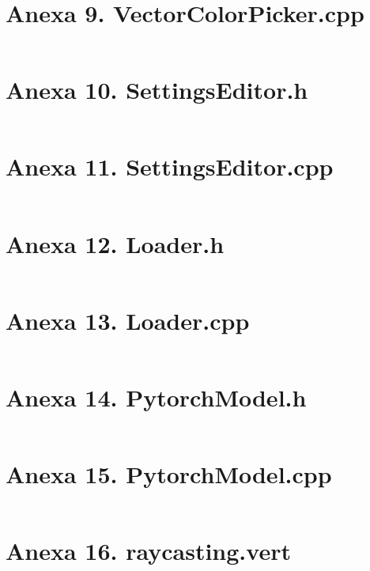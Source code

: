 \section{Anexa 9. VectorColorPicker.cpp}
\label{appendix:9_tfwidget_cpp}
\inputminted[linenos,tabsize=4,breaklines]{C++}{code/cpp/VectorColorPicker.cpp}

\section{Anexa 10. SettingsEditor.h}
\label{appendix:10_settingsedit_h}
\inputminted[linenos,tabsize=4,breaklines]{C++}{code/cpp/SettingsEditor.h}

\section{Anexa 11. SettingsEditor.cpp}
\label{appendix:11_settingsedit_cpp}
\inputminted[linenos,tabsize=4,breaklines]{C++}{code/cpp/SettingsEditor.cpp}

\section{Anexa 12. Loader.h}
\label{appendix:12_loader_h}
\inputminted[linenos,tabsize=4,breaklines]{C++}{code/cpp/Loader.h}

\section{Anexa 13. Loader.cpp}
\label{appendix:13_loader_cpp}
\inputminted[linenos,tabsize=4,breaklines]{C++}{code/cpp/Loader.cpp}

\section{Anexa 14. PytorchModel.h}
\label{appendix:14_ptmodel_h}
\inputminted[linenos,tabsize=4,breaklines]{C++}{code/cpp/PytorchModel.h}

\section{Anexa 15. PytorchModel.cpp}
\label{appendix:15_ptmodel_cpp}
\inputminted[linenos,tabsize=4,breaklines]{C++}{code/cpp/PytorchModel.cpp}

\section{Anexa 16. raycasting.vert}
\label{appendix:16_raycasting_vert}
\inputminted[linenos,tabsize=4,breaklines]{C++}{code/cpp/raycasting.vert}

